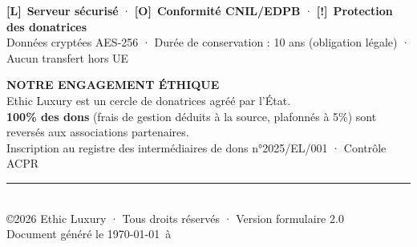 \documentclass[12pt, a4paper]{article}
\newcommand{\shield}{\textcolor{ethicGold}{\textbf{[!]}}}
\newcommand{\lockk}{\textcolor{ethicGold}{\textbf{[L]}}}
\newcommand{\globe}{\textcolor{ethicGold}{\textbf{[O]}}}
\begin{document}
\vspace{0.3cm}

\begin{center}
    \begin{minipage}{0.9\textwidth}
        \centering
        \lockk\ \textbf{Serveur sécurisé} · \globe\ \textbf{Conformité CNIL/EDPB} · \shield\ \textbf{Protection des donatrices} \\
        \vspace{0.2cm}
        {\tiny \textcolor{ethicGreenLight}{Données cryptées AES-256 · Durée de conservation : 10 ans (obligation légale) · Aucun transfert hors UE}}
    \end{minipage}
\end{center}

\vspace{0.5cm}

\begin{greenbox}
    \centering
    \textbf{\Large \textcolor{ethicGreen}{NOTRE ENGAGEMENT ÉTHIQUE}} \\
    \vspace{0.3cm}
    Ethic Luxury est un cercle de donatrices agréé par l'État. \\
    \textbf{100\% des dons} (frais de gestion déduits à la source, plafonnés à 5\%) sont reversés aux associations partenaires. \\
    \vspace{0.2cm}
    {\small \textcolor{ethicGreenLight}{Inscription au registre des intermédiaires de dons n°2025/EL/001 · Contrôle ACPR}}
\end{greenbox}

\vspace{0.5cm}

\begin{center}
    \rule{0.8\textwidth}{0.4pt} \\[0.3cm]
    {\small \textcolor{ethicGreenLight}{\copyright 2026 Ethic Luxury · Tous droits réservés · Version formulaire 2.0}} \\
    {\tiny \textcolor{ethicGreenLight}{Document généré le \today\ à \currenttime}}
\end{center}
\end{document}
